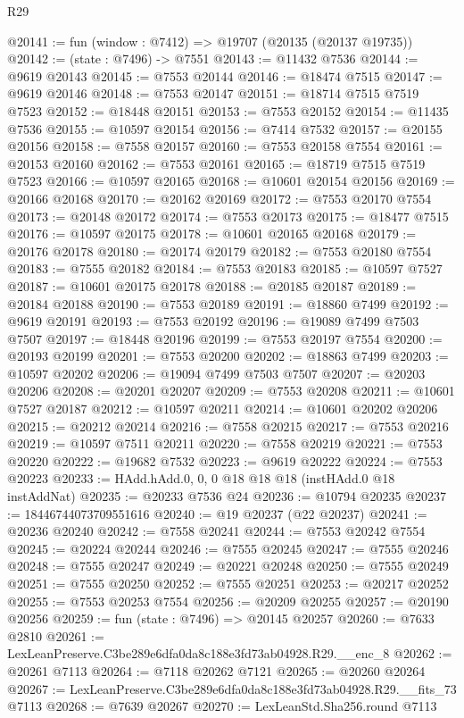 \begin{lexlean}{R29}
\begin{coremodule}
@20141 := fun (window : @7412) => @19707 (@20135 (@20137 @19735))
@20142 := (state : @7496) -> @7551
@20143 := @11432 @7536
@20144 := @9619 @20143
@20145 := @7553 @20144
@20146 := @18474 @7515
@20147 := @9619 @20146
@20148 := @7553 @20147
@20151 := @18714 @7515 @7519 @7523
@20152 := @18448 @20151
@20153 := @7553 @20152
@20154 := @11435 @7536
@20155 := @10597 @20154
@20156 := @7414 @7532
@20157 := @20155 @20156
@20158 := @7558 @20157
@20160 := @7553 @20158 @7554
@20161 := @20153 @20160
@20162 := @7553 @20161
@20165 := @18719 @7515 @7519 @7523
@20166 := @10597 @20165
@20168 := @10601 @20154 @20156
@20169 := @20166 @20168
@20170 := @20162 @20169
@20172 := @7553 @20170 @7554
@20173 := @20148 @20172
@20174 := @7553 @20173
@20175 := @18477 @7515
@20176 := @10597 @20175
@20178 := @10601 @20165 @20168
@20179 := @20176 @20178
@20180 := @20174 @20179
@20182 := @7553 @20180 @7554
@20183 := @7555 @20182
@20184 := @7553 @20183
@20185 := @10597 @7527
@20187 := @10601 @20175 @20178
@20188 := @20185 @20187
@20189 := @20184 @20188
@20190 := @7553 @20189
@20191 := @18860 @7499
@20192 := @9619 @20191
@20193 := @7553 @20192
@20196 := @19089 @7499 @7503 @7507
@20197 := @18448 @20196
@20199 := @7553 @20197 @7554
@20200 := @20193 @20199
@20201 := @7553 @20200
@20202 := @18863 @7499
@20203 := @10597 @20202
@20206 := @19094 @7499 @7503 @7507
@20207 := @20203 @20206
@20208 := @20201 @20207
@20209 := @7553 @20208
@20211 := @10601 @7527 @20187
@20212 := @10597 @20211
@20214 := @10601 @20202 @20206
@20215 := @20212 @20214
@20216 := @7558 @20215
@20217 := @7553 @20216
@20219 := @10597 @7511 @20211
@20220 := @7558 @20219
@20221 := @7553 @20220
@20222 := @19682 @7532
@20223 := @9619 @20222
@20224 := @7553 @20223
@20233 := HAdd.hAdd.{0, 0, 0} @18 @18 @18 (instHAdd.{0} @18 instAddNat)
@20235 := @20233 @7536 @24
@20236 := @10794 @20235
@20237 := 18446744073709551616
@20240 := @19 @20237 (@22 @20237)
@20241 := @20236 @20240
@20242 := @7558 @20241
@20244 := @7553 @20242 @7554
@20245 := @20224 @20244
@20246 := @7555 @20245
@20247 := @7555 @20246
@20248 := @7555 @20247
@20249 := @20221 @20248
@20250 := @7555 @20249
@20251 := @7555 @20250
@20252 := @7555 @20251
@20253 := @20217 @20252
@20255 := @7553 @20253 @7554
@20256 := @20209 @20255
@20257 := @20190 @20256
@20259 := fun (state : @7496) => @20145 @20257
@20260 := @7633 @2810
@20261 := LexLeanPreserve.C3be289e6dfa0da8c188e3fd73ab04928.R29.__enc_8
@20262 := @20261 @7113
@20264 := @7118 @20262 @7121
@20265 := @20260 @20264
@20267 := LexLeanPreserve.C3be289e6dfa0da8c188e3fd73ab04928.R29.__fits_73 @7113
@20268 := @7639 @20267
@20270 := LexLeanStd.Sha256.round @7113

\end{coremodule}
\end{lexlean}
